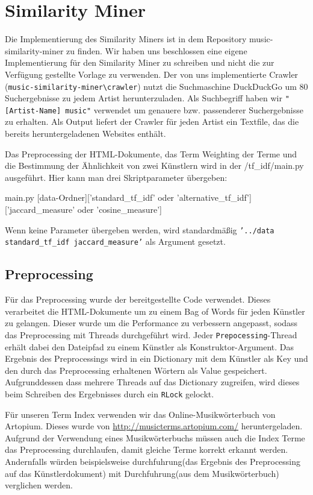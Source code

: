 \documentclass[prodmode,acmtecs]{acmsmall} %
\begin{document}
\section{Similarity Miner}
Die Implementierung des Similarity Miners ist in dem Repository music-similarity-miner zu finden. Wir haben uns beschlossen eine eigene Implementierung für den Similarity Miner zu schreiben und nicht die zur Verfügung gestellte Vorlage zu verwenden. Der von uns implementierte Crawler (\lstinline$music-similarity-miner\crawler$) nutzt die Suchmaschine DuckDuckGo um 80 Suchergebnisse zu jedem Artist herunterzuladen. Als Suchbegriff haben wir \lstinline$"[Artist-Name] music"$ verwendet um genauere bzw. passenderer Suchergebnisse zu erhalten. Als Output liefert der Crawler für jeden Artist ein Textfile, das die bereits heruntergeladenen Websites enthält.

Das Preprocessing der HTML-Dokumente, das Term Weighting der Terme und die Bestimmung der Ähnlichkeit von zwei Künstlern wird in der /tf\_idf/main.py ausgeführt.
Hier kann man drei Skriptparameter übergeben: 
\begin{python}
main.py [data-Ordner]['standard_tf_idf' oder 'alternative_tf_idf']
['jaccard_measure' oder 'cosine_measure']
\end{python}
Wenn keine Parameter übergeben werden, wird standardmäßig \texttt{'../data standard\_tf\_idf jaccard\_measure'} als Argument gesetzt. 

\subsection{Preprocessing}
Für das Preprocessing wurde der bereitgestellte Code verwendet. Dieses verarbeitet die HTML-Dokumente um zu einem Bag of Words für jeden Künstler zu gelangen. Dieser wurde um die Performance zu verbessern angepasst, sodass das Preprocessing mit Threads durchgeführt wird. Jeder \texttt{Prepocessing}-Thread erhält dabei den Dateipfad zu einem Künstler als Konstruktor-Argument. Das Ergebnis des Preprocessings wird in ein Dictionary mit dem Künstler als Key und den durch das Preprocessing erhaltenen Wörtern als Value gespeichert. Aufgrunddessen dass mehrere Threads auf das Dictionary zugreifen, wird dieses beim Schreiben des Ergebnisses durch ein \texttt{RLock} gelockt.

Für unseren Term Index verwenden wir das Online-Musikwörterbuch von Artopium. Dieses wurde von \url{http://musicterms.artopium.com/} heruntergeladen.
Aufgrund der Verwendung eines Musikwörterbuchs müssen auch die Index Terme das Preprocessing durchlaufen, damit gleiche Terme korrekt erkannt werden. Andernfalls würden beispielsweise \glqq durchfuhrung\grqq (das Ergebnis des Preprocessing auf das Künstlerdokument) mit \glqq Durchfuhrung\grqq (aus dem Musikwörterbuch) verglichen werden.
\end{document}
